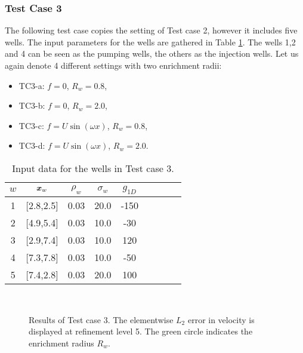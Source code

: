 


\subsubsection{Test Case 3}
The following test case copies the setting of Test case 2, however it includes five wells.
The input parameters for the wells are gathered in Table \ref{tab:tc3_data}.
The wells 1,2 and 4 can be seen as the pumping wells, the others as the injection wells.
Let us again denote 4 different settings with two enrichment radii:
\begin{itemize}
    \item TC3-a: $f=0$, $R_w=0.8$,
    \item TC3-b: $f=0$, $R_w=2.0$,
    \item TC3-c: $f=U\sin(\omega x)$, $R_w=0.8$,
    \item TC3-d: $f=U\sin(\omega x)$, $R_w=2.0$.
\end{itemize}
%
\begin{table}[!htb]
\begin{center}
\begin{tabular}{ccccccccc}
\toprule
$w$ & $\mathbf{\boldsymbol{x}}_w$  & $\rho_w$ & $\sigma_w$ & $g_{1D}$\\
\midrule
1& [2.8,2.5] & 0.03 & 20.0 & -150 \\
2& [4.9,5.4] & 0.03 & 10.0 & -30 \\
3& [2.9,7.4] & 0.03 & 10.0 & 120 \\
4& [7.3,7.8] & 0.03 & 10.0 & -50 \\
5& [7.4,2.8] & 0.03 & 20.0 & 100 \\
\bottomrule
\end{tabular}
\caption{Input data for the wells in Test case 3.}
\label{tab:tc3_data}
\end{center}
\end{table}
%
\begin{figure}[!htb]
    \centering
     \\
    \caption[Error distribution in Test case 3.]
    {Results of Test case 3. The elementwise $L_2$ error in velocity is displayed at refinement level 5.
    The green circle indicates the enrichment radius $R_w$. }
    \label{fig:mh_tc3_error}
\end{figure}
